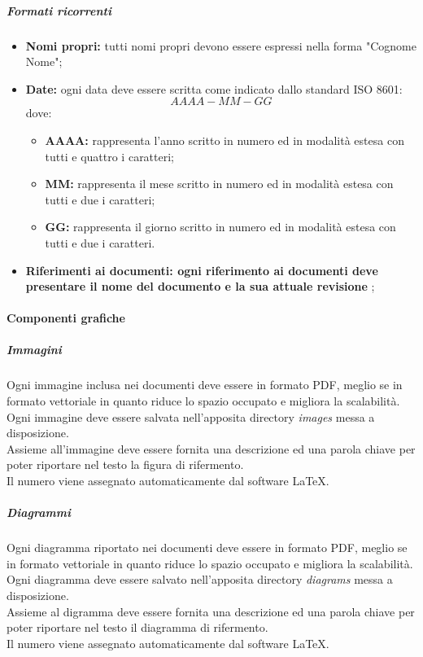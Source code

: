 				\subparagraph{Formati ricorrenti}
				\begin{itemize}
				\item \textbf{Nomi propri:} tutti nomi propri devono essere espressi nella forma "Cognome Nome";
				\item \textbf{Date:} ogni data deve essere scritta come indicato dallo standard ISO 8601:\\
					\begin{displaymath}
					AAAA-MM-GG
					\end{displaymath}
					dove:
					\begin{itemize}
					\item \textbf{AAAA:} rappresenta l'anno scritto in numero ed in modalità estesa con tutti e quattro i caratteri;
					\item \textbf{MM:} rappresenta il mese scritto in numero ed in modalità estesa con tutti e due i caratteri;
					\item \textbf{GG:} rappresenta il giorno scritto in numero ed in modalità estesa con tutti e due i caratteri.
					\end{itemize}
				\item \textbf{Riferimenti ai documenti: ogni riferimento ai documenti deve presentare il nome del documento e la sua attuale revisione} ;
				\end{itemize}

					
			\paragraph{Componenti grafiche}
				
				\subparagraph{Immagini}
				Ogni immagine inclusa nei documenti deve essere in formato PDF, meglio se in formato vettoriale in quanto riduce lo spazio occupato e migliora la scalabilità.\\
				Ogni immagine deve essere salvata nell'apposita directory \emph{images} messa a disposizione.\\
				Assieme all'immagine deve essere fornita una descrizione ed una parola chiave per poter riportare nel testo la figura di rifermento.\\
				Il numero viene assegnato automaticamente dal software \LaTeX.

				\subparagraph{Diagrammi}
				Ogni diagramma riportato nei documenti deve essere in formato PDF, meglio se in formato vettoriale in quanto riduce lo spazio occupato e migliora la scalabilità.\\
				Ogni diagramma deve essere salvato nell'apposita directory \emph{diagrams} messa a disposizione.\\
				Assieme al digramma deve essere fornita una descrizione ed una parola chiave per poter riportare nel testo il diagramma di rifermento.\\
				Il numero viene assegnato automaticamente dal software \LaTeX.
				
